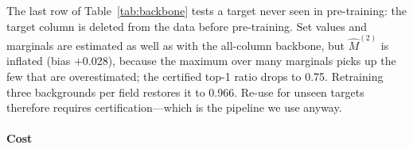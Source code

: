 The last row of Table~\ref{tab:backbone} tests a target never seen in pre-training: the target
column is deleted from the data before pre-training. Set values and marginals are estimated as well
as with the all-column backbone, but $\hat M^{(2)}$ is inflated (bias $+0.028$), because the
maximum over many marginals picks up the few that are overestimated; the certified top-1 ratio drops
to 0.75. Retraining three backgrounds per field restores it to 0.966. Re-use for unseen targets
therefore requires certification---which is the pipeline we use anyway.



\paragraph{Cost}

